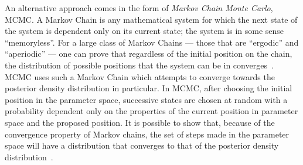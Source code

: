 An alternative approach comes in the form of \textit{Markov Chain Monte Carlo}, MCMC. A Markov Chain is any mathematical system for which the next state of the system is dependent only on its current state; the system is in some sense ``memoryless''. For a large class of Markov Chains --- those that are ``ergodic'' and ``aperiodic'' --- one can prove that regardless of the initial position on the chain, the distribution of possible positions that the system can be in converges~\cite{fellerIntroductionProbabilityTheory1968}. %
MCMC uses such a Markov Chain which attempts to converge towards the posterior density distribution in particular. In MCMC, after choosing the initial position in the parameter space, successive states are chosen at random with a probability dependent only on the properties of the current position in parameter space and the proposed position. It is possible to show that, because of the convergence property of Markov chains, the set of steps made in the parameter space will have a distribution that converges to that of the posterior density distribution~\cite{fellerIntroductionProbabilityTheory1968}.

